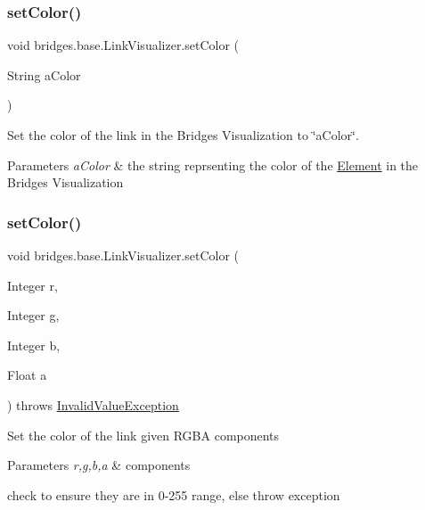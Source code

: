 \subsubsection{\texorpdfstring{set\+Color()}{setColor()}\hspace{0.1cm}{\footnotesize\ttfamily [1/2]}}
{\footnotesize\ttfamily void bridges.\+base.\+Link\+Visualizer.\+set\+Color (\begin{DoxyParamCaption}\item[{String}]{a\+Color }\end{DoxyParamCaption})}

Set the color of the link in the Bridges Visualization to \char`\"{}a\+Color\char`\"{}. 
\begin{DoxyParams}{Parameters}
{\em a\+Color} & the string reprsenting the color of the \hyperlink{classbridges_1_1base_1_1_element}{Element} in the Bridges Visualization \\
\hline
\end{DoxyParams}
\hypertarget{classbridges_1_1base_1_1_link_visualizer_a003905cfe33e1704555b2b3a1cf99bad}{}\label{classbridges_1_1base_1_1_link_visualizer_a003905cfe33e1704555b2b3a1cf99bad} 
\subsubsection{\texorpdfstring{set\+Color()}{setColor()}\hspace{0.1cm}{\footnotesize\ttfamily [2/2]}}
{\footnotesize\ttfamily void bridges.\+base.\+Link\+Visualizer.\+set\+Color (\begin{DoxyParamCaption}\item[{Integer}]{r,  }\item[{Integer}]{g,  }\item[{Integer}]{b,  }\item[{Float}]{a }\end{DoxyParamCaption}) throws \hyperlink{classbridges_1_1validation_1_1_invalid_value_exception}{Invalid\+Value\+Exception}}

Set the color of the link given R\+G\+BA components


\begin{DoxyParams}{Parameters}
{\em r,g,b,a} & components\\
\hline
\end{DoxyParams}
check to ensure they are in 0-\/255 range, else throw exception

